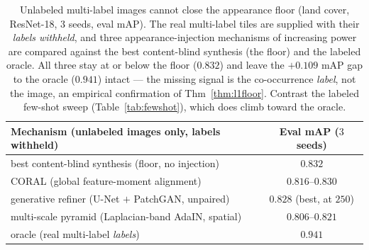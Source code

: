 \documentclass[11pt]{article}
\begin{document}
\begin{table}[t]
\centering
\caption{Unlabeled multi-label images cannot close the appearance floor (land cover, ResNet-18,
$3$ seeds, eval mAP). The real multi-label tiles are supplied with their \emph{labels withheld},
and three appearance-injection mechanisms of increasing power are compared against the best
content-blind synthesis (the floor) and the labeled oracle. All three stay at or below the floor
($0.832$) and leave the $+0.109$ mAP gap to the oracle ($0.941$) intact --- the missing signal is
the co-occurrence \emph{label}, not the image, an empirical confirmation of
Thm~\ref{thm:l1floor}. Contrast the labeled few-shot sweep (Table~\ref{tab:fewshot}), which does
climb toward the oracle.}
\label{tab:unlabeled}
\begin{tabular}{lc}
\toprule
Mechanism (unlabeled images only, labels withheld) & Eval mAP ($3$ seeds) \\
\midrule
best content-blind synthesis (floor, no injection)  & $0.832$ \\
CORAL (global feature-moment alignment)             & $0.816$--$0.830$ \\
generative refiner (U-Net $+$ PatchGAN, unpaired)   & $0.828$ (best, at $250$) \\
multi-scale pyramid (Laplacian-band AdaIN, spatial) & $0.806$--$0.821$ \\
\midrule
oracle (real multi-label \emph{labels})             & $0.941$ \\
\bottomrule
\end{tabular}
\end{table}
\end{document}
